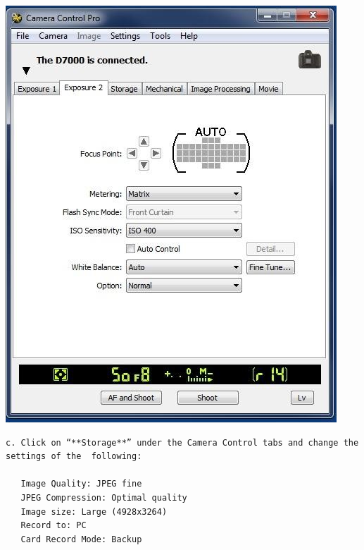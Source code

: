 \documentclass[]{book}
\begin{document}
\includegraphics{images/Camera4.jpg}

\begin{verbatim}
c. Click on “**Storage**” under the Camera Control tabs and change the settings of the  following:  

   Image Quality: JPEG fine  
   JPEG Compression: Optimal quality  
   Image size: Large (4928x3264)  
   Record to: PC  
   Card Record Mode: Backup
\end{verbatim}
\end{document}
